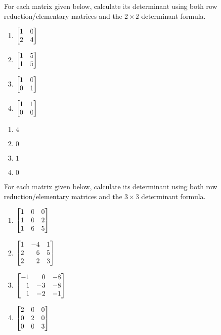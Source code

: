\begin{exercises}
	\begin{problist}
		\prob For each matrix given below, calculate its determinant using both
		row reduction/elementary matrices and the $2\times 2$ determinant
		formula.
		\begin{enumerate}
			\item $\mat{1 & 0 \\ 2 & 4}$

			\item $\mat{1 & 5 \\ 1 & 5}$

			\item $\mat{1 & 0 \\ 0 & 1}$

			\item $\mat{1 & 1 \\ 0 & 0}$
		\end{enumerate}
		\begin{solution}
			\begin{enumerate}
				\item $4$

				\item $0$

				\item $1$

				\item $0$
			\end{enumerate}
		\end{solution}
		\prob For each matrix given below, calculate its determinant using both
		row reduction/elementary matrices and the $3\times 3$ determinant
		formula.
		\begin{enumerate}
			\item $\mat{1 & 0 & 0 \\ 1 & 0 & 2 \\ 1 & 6 & 5}$

			\item $\mat{1 & -4 & 1 \\ 2 & 6 & 5 \\ 2 & 2 & 3}$

			\item $\mat{-1 & 0 & -8 \\ 1 & -3 & -8 \\ 1 & -2 & -1}$

			\item $\mat{2 & 0 & 0 \\ 0 & 2 & 0 \\ 0 & 0 & 3}$


\end{enumerate}
\end{problist}
\end{exercises}
